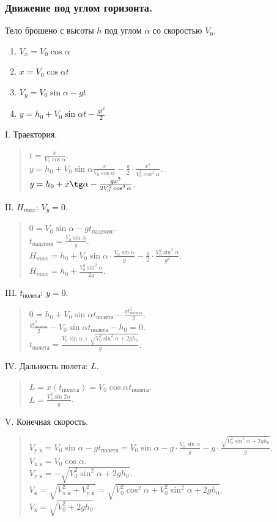 \documentclass[12pt]{article}
\begin{document}
	\subsubsection{Движение под углом горизонта.}
	Тело брошено с высоты $h$ под углом $\alpha$ со скоростью $V_0$.
	\begin{enumerate}
		\item $V_x = V_0 \cos\alpha$
		\item $x = V_0 \cos\alpha t$
		\item $V_y = V_0 \sin\alpha - gt$
		\item $y = h_0 + V_0 \sin\alpha t - \frac{gt^2}{2}$
	\end{enumerate}
	I. Траектория.
	\begin{quote}
		$t = \frac{x}{V_0 \cos\alpha}$. \\
		$y = h_0 + V_0 \sin\alpha \frac{x}{V_0 \cos\alpha} - \frac{g}{2} \cdot \frac{x^2}{V_0^2 \cos^2\alpha}$. \\
		$y = h_0 + x \tg\alpha - \frac{gx^2}{2V_0^2\cos^2\alpha}$. \\
	\end{quote}
	II. $H_{max}$: $V_{y} = 0$.
	\begin{quote}
		$0 = V_0 \sin\alpha - gt_{\text{падения}}$. \\
		$t_{\text{падения}} = \frac{V_0 \sin\alpha}{g}$. \\
		$H_{max} = h_0 + V_0 \sin\alpha \cdot \frac{V_0 \sin\alpha}{g} - \frac{g}{2} \cdot \frac{V_0^2 \sin^2\alpha}{g^2}$. \\
		$H_{max} = h_0 + \frac{V_0^2 \sin^2\alpha}{2g}$. \\
	\end{quote}
	III. $t_{\text{полета}}$: $y = 0$.
	\begin{quote}
		$0 = h_0 + V_0 \sin\alpha t_{\text{полета}} - \frac{gt_{\text{полета}}^2}{2}$. \\
		$\frac{gt_{\text{полета}}^2}{2} - V_0 \sin\alpha t_{\text{полета}} - h_0 = 0$. \\
		$t_{\text{полета}} = \frac{V_0 \sin\alpha + \sqrt{V_0^2\sin^2\alpha + 2gh_0}}{g}$. \\
	\end{quote}
	IV. Дальность полета: $L$.
	\begin{quote}
		$L = x(t_{\text{полета}}) = V_0 \cos\alpha t_{\text{полета}}$. \\
		$L = \frac{V_0^2 \sin2\alpha}{g}$. \\
	\end{quote}
	V. Конечная скорость.
	\begin{quote}
		$V_{\text{y к}} = V_0 \sin\alpha - gt_{\text{полета}} = V_0 \sin\alpha - g \cdot \frac{V_0 \sin\alpha}{g} - g \cdot \frac{\sqrt{V_0^2 \sin^2\alpha + 2gh_0}}{g}$. \\
		$V_{\text{x к}} = V_0 \cos\alpha$. \\
		$V_{\text{y к}} = -\sqrt{V_0^2 \sin^2\alpha + 2gh_0}$. \\
		$V_{\text{к}} = \sqrt{V_{\text{x к}}^2 + V_{\text{y к}}^2} = \sqrt{V_0^2 \cos^2\alpha + V_0^2 \sin^2\alpha + 2gh_0}$. \\
		$V_{\text{к}} = \sqrt{V_0^2 + 2gh_0}$. \\
	\end{quote}
\end{document}
